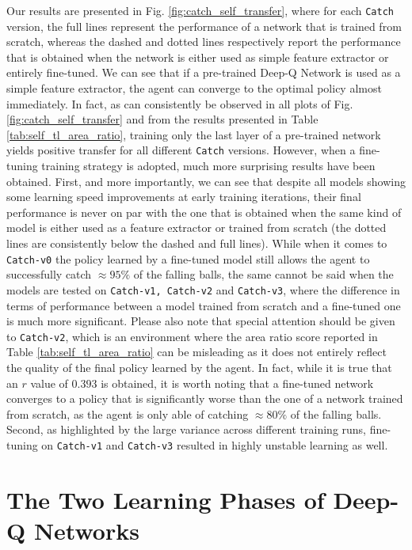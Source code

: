 Our results are presented in Fig. \ref{fig:catch_self_transfer}, where for each \texttt{Catch} version, the full lines represent the performance of a network that is trained from scratch, whereas the dashed and dotted lines respectively report the performance that is obtained when the network is either used as simple feature extractor or entirely fine-tuned. We can see that if a pre-trained Deep-Q Network is used as a simple feature extractor, the agent can converge to the optimal policy almost immediately. In fact, as can consistently be observed in all plots of Fig. \ref{fig:catch_self_transfer} and from the results presented in Table \ref{tab:self_tl_area_ratio}, training only the last layer of a pre-trained network yields positive transfer for all different \texttt{Catch} versions. However, when a fine-tuning training strategy is adopted, much more surprising results have been obtained. First, and more importantly, we can see that despite all models showing some learning speed improvements at early training iterations, their final performance is never on par with the one that is obtained when the same kind of model is either used as a feature extractor or trained from scratch (the dotted lines are consistently below the dashed and full lines). While when it comes to \texttt{Catch-v0} the policy learned by a fine-tuned model still allows the agent to successfully catch $\approx 95\%$ of the falling balls, the same cannot be said when the models are tested on \texttt{Catch-v1, Catch-v2} and \texttt{Catch-v3}, where the difference in terms of performance between a model trained from scratch and a fine-tuned one is much more significant. Please also note that special attention should be given to \texttt{Catch-v2}, which is an environment where the area ratio score reported in Table \ref{tab:self_tl_area_ratio} can be misleading as it does not entirely reflect the quality of the final policy learned by the agent. In fact, while it is true that an $r$ value of $0.393$ is obtained, it is worth noting that a fine-tuned network converges to a policy that is significantly worse than the one of a network trained from scratch, as the agent is only able of catching $\approx 80\%$ of the falling balls. Second, as highlighted by the large variance across different training runs, fine-tuning on \texttt{Catch-v1} and \texttt{Catch-v3} resulted in highly unstable learning as well.    



\section{The Two Learning Phases of Deep-Q Networks}
\label{sec:hybrid_self_transfer}

